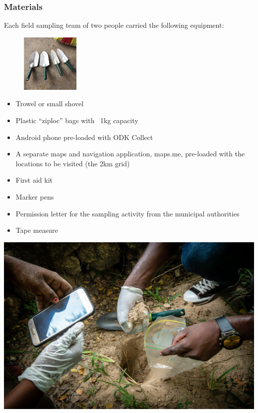 \documentclass[a4paper,12pt,twoside]{article}
\begin{document}
\newpage
\color{RHblue}
\subsubsection{Materials}
\color{RHgrey}
Each field sampling team of two people carried the following equipment:
\begin{figure}
  \centering
  \includegraphics[width=0.25\textwidth]{trowels.png}
\end{figure}

\begin{itemize}
  \item Trowel or small shovel
  \item Plastic ``ziploc'' bags with ~1kg capacity
  \item Android phone pre-loaded with ODK Collect
  \item A separate maps and navigation application, maps.me, pre-loaded with the locations to be visited (the 2km grid)
  \item First aid kit
  \item Marker pens
  \item Permission letter for the sampling activity from the municipal authorities
  \item Tape measure
\end{itemize}

\includegraphics[width=\textwidth]{DSC05592.jpg}  
\end{document}
